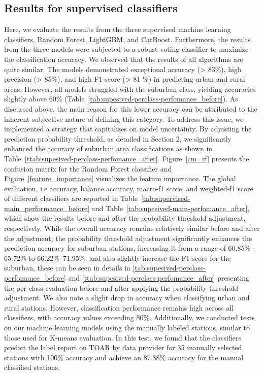 \documentclass[gmd, manuscript]{copernicus}
\begin{document}
\subsection{Results for supervised classifiers}
Here, we evaluate the results from the three supervised machine learning classifiers, Random Forest, LightGBM, and CatBoost. Furthermore, the results from the three models were subjected to a robust voting classifier to maximize the classification accuracy. We observed that the results of all algorithms are quite similar. The models demonstrated exceptional accuracy (> 83\%), high precision (> 85\%), and high F1-score (> 81 \%) in predicting urban and rural areas. However, all models struggled with the suburban class, yielding accuracies slightly above 60\% (Table~\ref{tab:supesived-perclass-perfomance_before}). As discussed above, the main reason for this lower accuracy can be attributed to the inherent subjective nature of defining this category. To address this issue, we implemented a  strategy that capitalizes on model uncertainty. By adjusting the prediction probability threshold, as detailed in Section 2, we significantly enhanced the accuracy of suburban area classifications as shown in Table~\ref{ttab:supesived-perclass-perfomance_after}. 
Figure~\ref{cm_rf} presents the confusion matrix for the Random Forest classifier and Figure~\ref{feature_importance} visualizes the feature importance. The global evaluation, i.e accuracy, balance accuracy, macro-f1 score, and weighted-f1 score of different classifiers are reported in Table~\ref{tab:supervised-main_performance_before} and Table~\ref{tab:supesived-main-perfomance_after}, which show the results before and after the probability threshold adjustment, respectively. While the overall accuracy remains relatively similar before and after the adjustment, the probability threshold adjustment significantly enhances the prediction accuracy for suburban stations, increasing it from a range of 60.85\% - 65.72\% to 66.22\%–71.95\%, and also slightly increase the F1-score for the suburban, these can be seen in details in \ref{tab:supesived-perclass-perfomance_before} and \ref{ttab:supesived-perclass-perfomance_after} presenting the per-class evaluation before and after applying the probability threshold adjustment. We also note a slight drop in accuracy when classifying urban and rural stations. However, classification performance remains high across all classifiers, with accuracy values exceeding 80\%. 
Additionally, we conducted tests on our machine learning models using the manually labeled stations, similar to those used for K-means evaluation. In this test, we found that the classifiers predict the label report on TOAR by data provider for 35 manually selected stations with 100\% accuracy and achieve an 87.88\% accuracy for the manual classified stations. 
\end{document}
